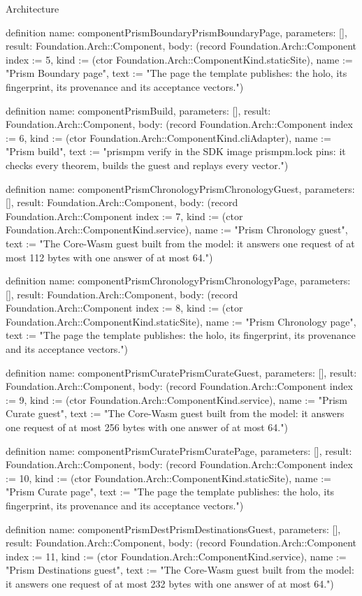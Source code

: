 \begin{lexlean}{Architecture}
\begin{semanticmodule}
definition{
  name: componentPrismBoundaryPrismBoundaryPage,
  parameters: [],
  result: Foundation.Arch::Component,
  body: (record Foundation.Arch::Component {index := 5, kind := (ctor Foundation.Arch::ComponentKind.staticSite), name := "Prism Boundary page", text := "The page the template publishes: the holo, its fingerprint, its provenance and its acceptance vectors."})
}

definition{
  name: componentPrismBuild,
  parameters: [],
  result: Foundation.Arch::Component,
  body: (record Foundation.Arch::Component {index := 6, kind := (ctor Foundation.Arch::ComponentKind.cliAdapter), name := "Prism build", text := "prismpm verify in the SDK image prismpm.lock pins: it checks every theorem, builds the guest and replays every vector."})
}

definition{
  name: componentPrismChronologyPrismChronologyGuest,
  parameters: [],
  result: Foundation.Arch::Component,
  body: (record Foundation.Arch::Component {index := 7, kind := (ctor Foundation.Arch::ComponentKind.service), name := "Prism Chronology guest", text := "The Core-Wasm guest built from the model: it answers one request of at most 112 bytes with one answer of at most 64."})
}

definition{
  name: componentPrismChronologyPrismChronologyPage,
  parameters: [],
  result: Foundation.Arch::Component,
  body: (record Foundation.Arch::Component {index := 8, kind := (ctor Foundation.Arch::ComponentKind.staticSite), name := "Prism Chronology page", text := "The page the template publishes: the holo, its fingerprint, its provenance and its acceptance vectors."})
}

definition{
  name: componentPrismCuratePrismCurateGuest,
  parameters: [],
  result: Foundation.Arch::Component,
  body: (record Foundation.Arch::Component {index := 9, kind := (ctor Foundation.Arch::ComponentKind.service), name := "Prism Curate guest", text := "The Core-Wasm guest built from the model: it answers one request of at most 256 bytes with one answer of at most 64."})
}

definition{
  name: componentPrismCuratePrismCuratePage,
  parameters: [],
  result: Foundation.Arch::Component,
  body: (record Foundation.Arch::Component {index := 10, kind := (ctor Foundation.Arch::ComponentKind.staticSite), name := "Prism Curate page", text := "The page the template publishes: the holo, its fingerprint, its provenance and its acceptance vectors."})
}

definition{
  name: componentPrismDestPrismDestinationsGuest,
  parameters: [],
  result: Foundation.Arch::Component,
  body: (record Foundation.Arch::Component {index := 11, kind := (ctor Foundation.Arch::ComponentKind.service), name := "Prism Destinations guest", text := "The Core-Wasm guest built from the model: it answers one request of at most 232 bytes with one answer of at most 64."})
}


\end{semanticmodule}
\end{lexlean}
